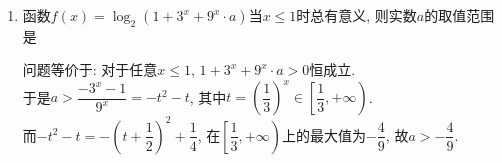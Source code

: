 \begin{enumerate}
    \begin{jieda}
    $\iff -a^2=(\lg2+\lg{x})(\lg3+\lg{x})\iff -a^2=\lg^2x+\lg6\cdot\lg{x}+\lg2\lg3$. \\
    于是$-a^2>-\left(\dfrac{\lg\dfrac{3}{2}}{2}\right)^2$, 故$-\dfrac{\lg\dfrac{3}{2}}{2}<a<\dfrac{\lg\dfrac{3}{2}}{2}$. \\
    此时$\lg{x_1}+\lg{x_2}=-\lg6$, 即$x_1x_2=\dfrac{1}{6}$. 
    \end{jieda}
    \item 函数$f(x)=\log_2(1+3^x+9^x\cdot a)$当$x\leq1$时总有意义, 则实数$a$的取值范围是
    \begin{jieda}
    问题等价于: 对于任意$x\leq 1$, $1+3^x+9^x\cdot a>0$恒成立. \\
    于是$a>\dfrac{-3^x-1}{9^x}=-t^2-t$, 其中$t=\left(\dfrac{1}{3}\right)^x\in\left[\dfrac{1}{3},+\infty\right)$. \\
    而$-t^2-t=-\left(t+\dfrac{1}{2}\right)^2+\dfrac{1}{4}$, 在$\left[\dfrac{1}{3},+\infty\right)$上的最大值为$-\dfrac{4}{9}$, 故$a>-\dfrac{4}{9}$. 
    \end{jieda}
    
\end{enumerate}